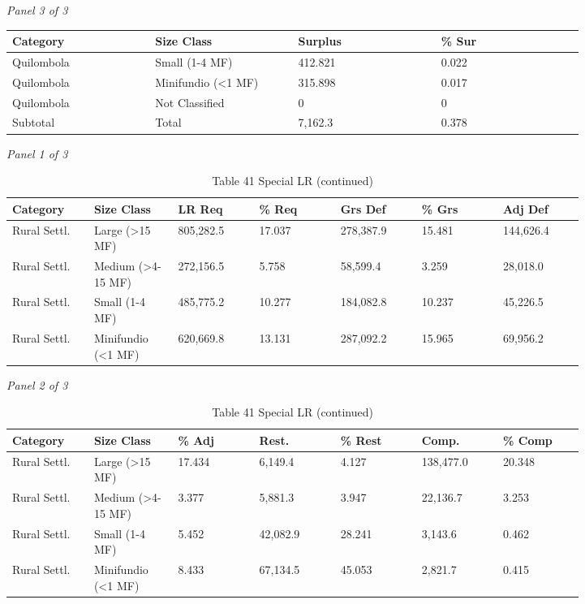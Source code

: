 \documentclass[12pt]{article}
\begin{document}
\begin{landscape}
\begin{table}[H]
\vspace{0.6em}

\textit{Panel 3 of 3}\\[2pt]
{\fontsize{12}{14}\selectfont
\setlength{\tabcolsep}{3pt}
\renewcommand{\arraystretch}{1.08}
\begin{tabular}{p{0.205\linewidth}p{0.205\linewidth}p{0.205\linewidth}p{0.205\linewidth}}
\toprule
Category & Size Class & Surplus & \% Sur \\
\midrule
Quilombola & Small (1-4 MF) & 412.821 & 0.022 \\
Quilombola & Minifundio (<1 MF) & 315.898 & 0.017 \\
Quilombola & Not Classified & 0 & 0 \\
Subtotal & Total & 7,162.3 & 0.378 \\
\bottomrule
\end{tabular}
}
\end{table}
\begin{table}[H]
\centering
\caption{Table 41 Special LR (continued)}
\textit{Panel 1 of 3}\\[2pt]
{\fontsize{12}{14}\selectfont
\setlength{\tabcolsep}{3pt}
\renewcommand{\arraystretch}{1.08}
\begin{tabular}{p{0.117\linewidth}p{0.117\linewidth}p{0.117\linewidth}p{0.117\linewidth}p{0.117\linewidth}p{0.117\linewidth}p{0.117\linewidth}}
\toprule
Category & Size Class & LR Req & \% Req & Grs Def & \% Grs & Adj Def \\
\midrule
Rural Settl. & Large (>15 MF) & 805,282.5 & 17.037 & 278,387.9 & 15.481 & 144,626.4 \\
Rural Settl. & Medium (>4-15 MF) & 272,156.5 & 5.758 & 58,599.4 & 3.259 & 28,018.0 \\
Rural Settl. & Small (1-4 MF) & 485,775.2 & 10.277 & 184,082.8 & 10.237 & 45,226.5 \\
Rural Settl. & Minifundio (<1 MF) & 620,669.8 & 13.131 & 287,092.2 & 15.965 & 69,956.2 \\
\bottomrule
\end{tabular}
}

\vspace{0.6em}

\textit{Panel 2 of 3}\\[2pt]
{\fontsize{12}{14}\selectfont
\setlength{\tabcolsep}{3pt}
\renewcommand{\arraystretch}{1.08}
\begin{tabular}{p{0.117\linewidth}p{0.117\linewidth}p{0.117\linewidth}p{0.117\linewidth}p{0.117\linewidth}p{0.117\linewidth}p{0.117\linewidth}}
\toprule
Category & Size Class & \% Adj & Rest. & \% Rest & Comp. & \% Comp \\
\midrule
Rural Settl. & Large (>15 MF) & 17.434 & 6,149.4 & 4.127 & 138,477.0 & 20.348 \\
Rural Settl. & Medium (>4-15 MF) & 3.377 & 5,881.3 & 3.947 & 22,136.7 & 3.253 \\
Rural Settl. & Small (1-4 MF) & 5.452 & 42,082.9 & 28.241 & 3,143.6 & 0.462 \\
Rural Settl. & Minifundio (<1 MF) & 8.433 & 67,134.5 & 45.053 & 2,821.7 & 0.415 \\
\bottomrule
\end{tabular}
}


\end{table}
\end{landscape}
\end{document}
